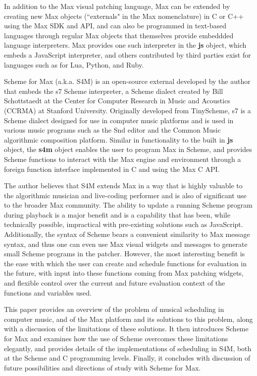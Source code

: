 \documentclass[acmsmall]{acmart}
\begin{document}
In addition to the Max visual patching language, Max can be extended
by creating new Max objects (``externals" in the Max nomenclature) in C or C++ 
using the Max SDK and API, and can also be programmed in text-based 
languages through regular Max objects that themselves provide embeddded language
interpreters. Max provides one such interpreter in the \textbf{js} object, 
which embeds a JavaScript interpreter, and others contributed by third parties
exist for languages such as for Lua, Python, and Ruby. 

Scheme for Max (a.k.a. S4M) is an open-source external developed by the 
author that embeds the s7 Scheme interpreter, a Scheme dialect created by
Bill Schottstaedt at the  Center for Computer Research in Music and Acoustics
(CCRMA) at Stanford University. Originally developed
from TinyScheme, s7 is a Scheme dialect designed for use in computer music
platforms and is used in various music programs such as the Snd editor and the
Common Music algorithmic composition platform. 
Similar in functionality to the built
in \textbf{js} object, the \textbf{s4m} object enables the user to program Max in Scheme,
and provides Scheme functions to interact with the Max engine and environment through
a foreign function interface implemented in C and using the Max C API.

The author believes that S4M extends Max in a way that is highly valuable to 
the algorithmic musician and live-coding performer and is also of significant 
use to the broader Max community. The ability to update
a running Scheme program during playback is a major benefit
and is a capability that has been, while technically possible, impractical
with pre-existing solutions such as JavaScript. Additionally, the syntax
of Scheme bears a convenient similarity to Max message syntax, and thus 
one can even use Max visual widgets and messages to generate small Scheme programs in the
patcher. However, the most interesting benefit is the ease with which the user 
can create and schedule functions for evaluation in the future, with 
input into these functions coming from Max patching widgets, and flexible control
over the current and future evaluation context of the functions and variables used.

This paper provides an overview of the problem of musical scheduling
in computer music, and of the Max platform and its solutions to this problem, 
along with a discussion of the limitations of these solutions.
It then introduces Scheme for Max and examines how the use of Scheme
overcomes these limitations elegantly, and provides details of
the implementations of scheduling in S4M, both at the Scheme and
C programming levels. Finally, it concludes with discussion of future
possibilities and directions of study with Scheme for Max. 
\end{document}
